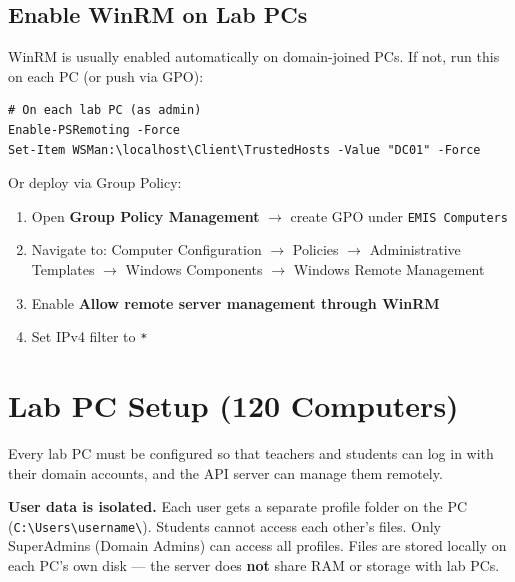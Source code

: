 ﻿\documentclass[12pt,a4paper]{article}
\begin{document}
\subsection{Enable WinRM on Lab PCs}

WinRM is usually enabled automatically on domain-joined PCs. If not, run this on each PC (or push via GPO):

\begin{lstlisting}
# On each lab PC (as admin)
Enable-PSRemoting -Force
Set-Item WSMan:\localhost\Client\TrustedHosts -Value "DC01" -Force
\end{lstlisting}

Or deploy via Group Policy:
\begin{enumerate}
    \item Open \textbf{Group Policy Management} $\rightarrow$ create GPO under \texttt{EMIS Computers}
    \item Navigate to: Computer Configuration $\rightarrow$ Policies $\rightarrow$ Administrative Templates $\rightarrow$ Windows Components $\rightarrow$ Windows Remote Management
    \item Enable \textbf{Allow remote server management through WinRM}
    \item Set IPv4 filter to \texttt{*}
\end{enumerate}

\section{Lab PC Setup (120 Computers)}

Every lab PC must be configured so that teachers and students can log in with their domain accounts, and the API server can manage them remotely.

\begin{warningbox}
\textbf{User data is isolated.} Each user gets a separate profile folder on the PC (\texttt{C:\textbackslash Users\textbackslash username\textbackslash}). Students cannot access each other's files. Only SuperAdmins (Domain Admins) can access all profiles. Files are stored locally on each PC's own disk --- the server does \textbf{not} share RAM or storage with lab PCs.
\end{warningbox}
\end{document}
